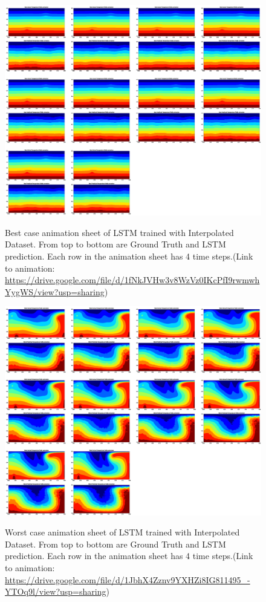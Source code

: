 \begin{figure}[H]
    \centering
    \caption{Best case animation sheet of LSTM trained with Interpolated Dataset. From top to bottom are Ground Truth and LSTM prediction. Each row in the animation sheet has 4 time steps.(Link to animation: \url{https://drive.google.com/file/d/1fNkJVHw3v8WzVz0IKcPfI9rwmwhYygWS/view?usp=sharing})}
    \includegraphics[scale=0.15]{figures/mantle_convection_images/larger_dataset_interpolated/LSTM_Best_GIF_sheet.png}
     \label{figure:LSTM_interpolated_best_gif}
\end{figure}

\begin{figure}[H]
    \centering
    \caption{Worst case animation sheet of LSTM trained with Interpolated Dataset. From top to bottom are Ground Truth and LSTM prediction. Each row in the animation sheet has 4 time steps.(Link to animation: \url{https://drive.google.com/file/d/1JbhX4Zznv9YXHZi8IG811495_-YTOq9l/view?usp=sharing})}
    \includegraphics[scale=0.15]{figures/mantle_convection_images/larger_dataset_interpolated/LSTM_Worst_GIF_sheet.png}
    \label{figure:LSTM_interpolated_worst_gif}
\end{figure}


